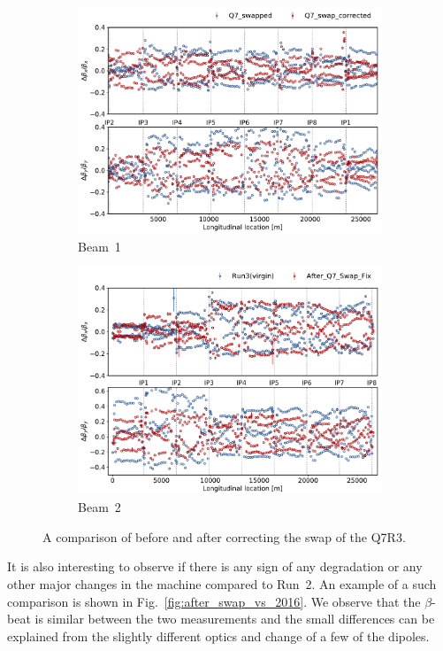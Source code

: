 \documentclass[a4paper]{cernatsnote}
\begin{document}
\begin{figure}[ht]
\begin{subfigure}{.5\textwidth}
  \centering
  \includegraphics[width=.8\linewidth]{plots/beam1/beta_beat_before_after_swap.pdf}  
  \caption{Beam~1}
\end{subfigure}
\begin{subfigure}{.5\textwidth}
  \centering
  \includegraphics[width=.8\linewidth]{plots/beam2/beta_beat_before_vs_after_Q7_swap.pdf}  
  \caption{Beam~2}
\end{subfigure}
\caption{A comparison of before and after correcting the swap of the Q7R3.}
\label{fig:before_after_swap}
\end{figure}

It is also interesting to observe if there is any sign of any degradation or any other major changes in the machine compared to Run~2. An example of a such comparison is shown in Fig.~\ref{fig:after_swap_vs_2016}. We observe that the $\beta$-beat is similar between the two measurements and the small differences can be explained from the slightly different optics and change of a few of the dipoles. 
\end{document}
